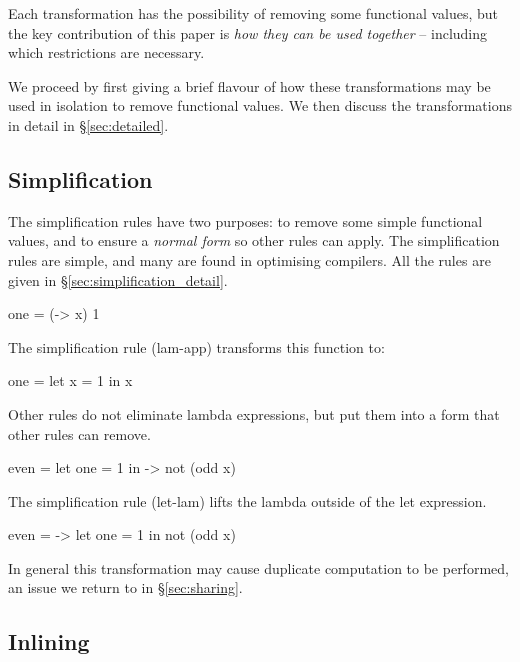 \documentclass[preprint]{sigplanconf}
\begin{document}
Each transformation has the possibility of removing some functional values, but the key contribution of this paper is \textit{how they can be used together} -- including which restrictions are necessary.

We proceed by first giving a brief flavour of how these transformations may be used in isolation to remove functional values. We then discuss the transformations in detail in \S\ref{sec:detailed}.

\subsection{Simplification}

The simplification rules have two purposes: to remove some simple functional values, and to ensure a \textit{normal form} so other rules can apply. The simplification rules are simple, and many are found in optimising compilers. All the rules are given in \S\ref{sec:simplification_detail}.

\begin{example}
\begin{code}
one = (\x -> x) 1
\end{code}

\noindent The simplification rule (lam-app) transforms this function to:

\begin{code}
one = let x = 1 in x
\end{code}\codeexample
\end{example}\smallskip

\noindent Other rules do not eliminate lambda expressions, but put them into a form that other rules can remove.

\begin{example}
\begin{code}
even =  let  one = 1
        in   \x -> not (odd x)
\end{code}

\noindent The simplification rule (let-lam) lifts the lambda outside of the let expression.

\begin{code}
even = \x ->  let  one = 1
              in   not (odd x)
\end{code}

\noindent In general this transformation may cause duplicate computation to be performed, an issue we return to in \S\ref{sec:sharing}.
\end{example}


\subsection{Inlining}
\end{document}
